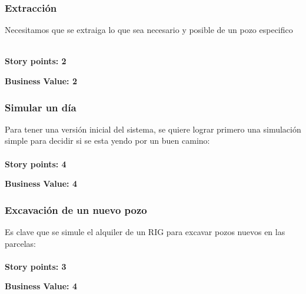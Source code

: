 \documentclass[10pt,a4paper]{article}
\begin{document}
\subsubsection{Extracción}
    Necesitamos que se extraiga lo que sea necesario y posible de un pozo especifico

    \\
    
    \textbf{Story points: 2}
    
    \textbf{Business Value: 2}

\subsubsection{Simular un día}
    Para tener una versión inicial del sistema, se quiere lograr primero una simulación simple para decidir si se esta yendo por un buen camino:\\
    
    \\
    
    \textbf{Story points: 4}
    
    \textbf{Business Value: 4}
    
\subsubsection{Excavación de un nuevo pozo}
    Es clave que se simule el alquiler de un RIG para excavar pozos nuevos en las parcelas:\\
    
    \\
    
    \textbf{Story points: 3}
    
    \textbf{Business Value: 4}\\
    
    \\
    
\end{document}
